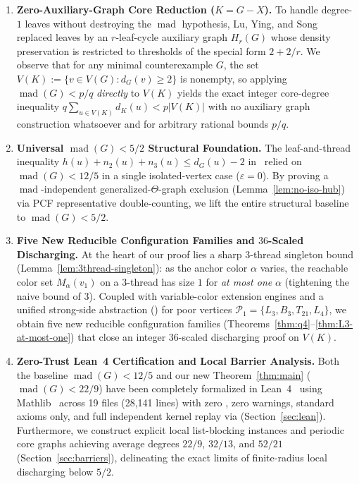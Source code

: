 \documentclass[11pt,a4paper]{article}
\theoremstyle{definition}
\newcommand{\mad}{\operatorname{mad}}
\newcommand{\Ppoor}{\mathcal{P}_1}
\newcommand{\code}[1]{\texttt{\detokenize{#1}}}
\begin{document}
\begin{enumerate}[leftmargin=*,itemsep=3pt]
  \item \textbf{Zero-Auxiliary-Graph Core Reduction ($K = G - X$).} To handle degree-$1$ leaves without destroying the $\mad$ hypothesis, Lu, Ying, and Song~\cite{LuYingSong2026} replaced leaves by an $r$-leaf-cycle auxiliary graph $H_r(G)$ whose density preservation is restricted to thresholds of the special form $2 + 2/r$. We observe that for any minimal counterexample $G$, the set $V(K) := \{v \in V(G) : d_G(v) \ge 2\}$ is nonempty, so applying $\mad(G) < p/q$ \emph{directly} to $V(K)$ yields the exact integer core-degree inequality $q\sum_{u\in V(K)} d_K(u) < p|V(K)|$ with no auxiliary graph construction whatsoever and for arbitrary rational bounds $p/q$.
  \item \textbf{Universal $\mad(G) < 5/2$ Structural Foundation.} The leaf-and-thread inequality $h(u) + n_2(u) + n_3(u) \le d_G(u) - 2$ in~\cite{LuYingSong2026} relied on $\mad(G) < 12/5$ in a single isolated-vertex case ($\varepsilon = 0$). By proving a $\mad$-independent generalized-$\Theta$-graph exclusion (Lemma~\ref{lem:no-iso-hub}) via PCF representative double-counting, we lift the entire structural baseline to $\mad(G) < 5/2$.
  \item \textbf{Five New Reducible Configuration Families and $36$-Scaled Discharging.} At the heart of our proof lies a sharp $3$-thread singleton bound (Lemma~\ref{lem:3thread-singleton}): as the anchor color $\alpha$ varies, the reachable color set $M_\alpha(v_1)$ on a $3$-thread has size $1$ for \emph{at most one} $\alpha$ (tightening the naive bound of $3$). Coupled with variable-color extension engines and a unified strong-side abstraction (\code{SideData}) for poor vertices $\Ppoor = \{L_3, B_3, T_{21}, L_4\}$, we obtain five new reducible configuration families (Theorems~\ref{thm:q4}--\ref{thm:L3-at-most-one}) that close an integer $36$-scaled discharging proof on $V(K)$.
  \item \textbf{Zero-Trust Lean~4 Certification and Local Barrier Analysis.} Both the baseline $\mad(G) < 12/5$ and our new Theorem~\ref{thm:main} ($\mad(G) < 22/9$) have been completely formalized in Lean~4~\cite{deMouraUllrich2021} using Mathlib~\cite{Mathlib2020} across 19 files (28{,}141 lines) with zero \code{sorry}, zero warnings, standard axioms only, and full independent kernel replay via \code{leanchecker} (Section~\ref{sec:lean}). Furthermore, we construct explicit local list-blocking instances and periodic core graphs achieving average degrees $22/9$, $32/13$, and $52/21$ (Section~\ref{sec:barriers}), delineating the exact limits of finite-radius local discharging below $5/2$.
\end{enumerate}
\end{document}
